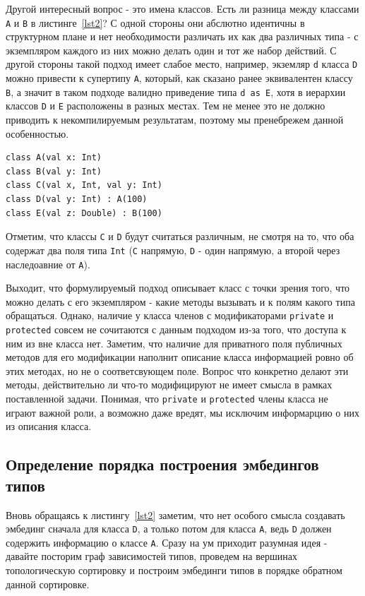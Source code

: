\documentclass[times,specification,annotation]{itmo-student-thesis}
\begin{document}
Другой интересный вопрос - это имена классов. Есть ли разница между классами \texttt{A} и \texttt{B} в листинге~\ref{lst2}? С одной стороны они абслютно идентичны в структурном плане и нет необходимости различать их как два различных типа - с экземпляром каждого из них можно делать один и тот же набор действий. С другой стороны такой подход имеет слабое место, например, экземляр \texttt{d} класса \texttt{D} можно привести к супертипу \texttt{A}, который, как сказано ранее эквивалентен классу \texttt{B}, а значит в таком подходе валидно приведение типа \texttt{d as E}, хотя в иерархии классов \texttt{D} и \texttt{E} расположены в разных местах. Тем не менее это не должно приводить к некомпилируемым результатам, поэтому мы пренебрежем данной особенностью.

\begin{lstlisting}[float=!h,caption={Пример исходного кода на Kotlin},label={lst2}]
class A(val x: Int)
class B(val y: Int)
class C(val x, Int, val y: Int)
class D(val y: Int) : A(100)
class E(val z: Double) : B(100)
\end{lstlisting}

Отметим, что классы \texttt{C} и \texttt{D} будут считаться различным, не смотря на то, что оба содержат два поля типа \texttt{Int} (\texttt{C} напрямую, \texttt{D} - один напрямую, а второй через наследоавние от \texttt{А}).

Выходит, что формулируемый подход описывает класс с точки зрения того, что можно делать с его экземпляром - какие методы вызывать и к полям какого типа обращаться. Однако, наличие у класса членов с модификаторами \texttt{private} и \texttt{protected} совсем не сочитаются с данным подходом из-за того, что доступа к ним из вне класса нет. Заметим, что наличие для приватного поля публичных методов для его модификации наполнит описание класса информацией ровно об этих методах, но не о соответсвующем поле. Вопрос что конкретно делают эти методы, действительно ли что-то модифицируют не имеет смысла в рамках поставленной задачи. Понимая, что \texttt{private} и \texttt{protected} члены класса не играют важной роли, а возможно даже вредят, мы исключим информарцию о них из описания класса.

\subsection{Определение порядка построения эмбедингов типов}\label{order}
Вновь обращаясь к листингу~\ref{lst2} заметим, что нет особого смысла создавать эмбединг сначала для класса \texttt{D}, а только потом для класса \texttt{A}, ведь \texttt{D} должен содержить информацию о классе \texttt{A}. Сразу на ум приходит разумная идея - давайте посторим граф зависимостей типов, проведем на вершинах топологическую сортировку и построим эмбединги типов в порядке обратном данной сортировке.
\end{document}
